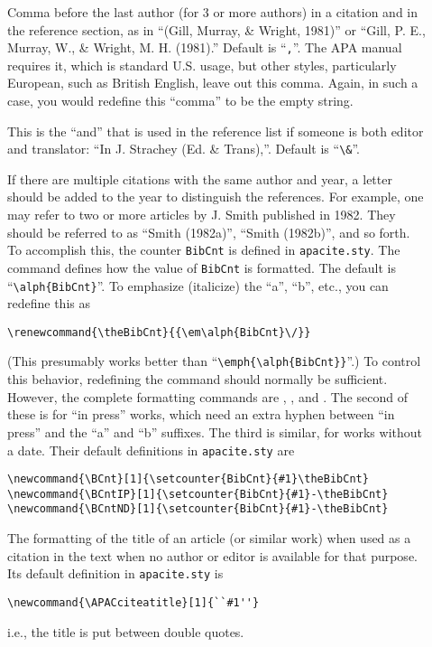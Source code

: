 \documentclass{article}
\newcommand{\fname}[1]{\texttt{#1}}%
\newcommand{\cmd}[1]{\texttt{\string#1}}%
\begin{document}
\begin{description}
  \item[\cmd{\BCBL}] Comma before the last author (for 3 or more authors)
      in a citation and in the reference section, as in ``(Gill, Murray,
      \& Wright, 1981)'' or ``Gill, P. E., Murray, W., \& Wright, M. H.
      (1981).'' Default is ``\verb+,+''. The APA manual requires it,
      which is standard U.S. usage, but other styles, particularly
      European, such as British English, leave out this comma. Again,
      in such a case, you would redefine this ``comma'' to
      be the empty string.

  \item[\cmd{\BAnd}] This is the ``and'' that is used in the reference list
      if someone is both editor and translator:
      ``In J. Strachey (Ed. \& Trans),''. Default is ``\verb+\&+''.

  \item[\cmd{\theBibCnt}] If there are multiple citations with the same
      author and year, a letter should be added to the year to distinguish
      the references. For example, one may refer to two or more articles
      by J. Smith published in 1982. They should be referred to as
      ``Smith (1982a)'', ``Smith (1982b)'', and so forth. To accomplish
      this, the counter \verb+BibCnt+ is defined in \fname{apacite.sty}.
      The \cmd{\theBibCnt} command defines how the value of \verb+BibCnt+
      is formatted. The default is ``\verb+\alph{BibCnt}+''. To
      emphasize (italicize) the ``a'', ``b'', etc., you can redefine
      this as
\begin{verbatim}
\renewcommand{\theBibCnt}{{\em\alph{BibCnt}\/}}
\end{verbatim}
      (This presumably works better than ``\verb+\emph{\alph{BibCnt}}+''.)
      To control this behavior, redefining the \cmd{\theBibCnt} command
      should normally be sufficient. However, the complete formatting
      commands are \cmd{\BCnt}, \cmd{\BCntIP}, and \cmd{\BCntND}. The
      second of these is for ``in press'' works, which need an extra hyphen
      between ``in press'' and the ``a'' and ``b'' suffixes. The third is
      similar, for works without a date. Their default definitions
      in \fname{apacite.sty} are
\begin{verbatim}
\newcommand{\BCnt}[1]{\setcounter{BibCnt}{#1}\theBibCnt}
\newcommand{\BCntIP}[1]{\setcounter{BibCnt}{#1}-\theBibCnt}
\newcommand{\BCntND}[1]{\setcounter{BibCnt}{#1}-\theBibCnt}
\end{verbatim}

  \item[\cmd{\APACciteatitle}] The formatting of the title of an
      article (or similar work)
      when used as a citation in the text when no author or editor
      is available for that purpose. Its default definition
      in \fname{apacite.sty} is
\begin{verbatim}
\newcommand{\APACciteatitle}[1]{``#1''}
\end{verbatim}
      i.e., the title is put between double quotes.


\end{description}
\end{document}
